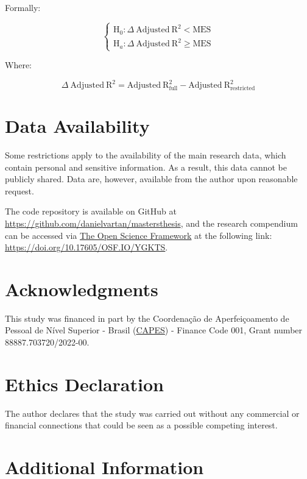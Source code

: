 \documentclass[
12pt,
openright,
oneside,
a4paper,
chapter=TITLE,
section=TITLE,
french,
spanish,
brazil,
english
]{abntex2}
\begin{document}
Formally:

\[
\begin{cases}
\text{H}_{0}: \Delta \ \text{Adjusted} \ \text{R}^{2} < \text{MES} \\
\text{H}_{a}: \Delta \ \text{Adjusted} \ \text{R}^{2} \geq \text{MES}
\end{cases}
\]

\medskip

Where:

\[
\Delta \ \text{Adjusted} \ \text{R}^{2} = \text{Adjusted} \ \text{R}^{2}_{\text{full}} - \text{Adjusted} \ \text{R}^{2}_{\text{restricted}}
\]

\medskip

\section{Data Availability}\label{data-availability}

Some restrictions apply to the availability of the main research data,
which contain personal and sensitive information. As a result, this data
cannot be publicly shared. Data are, however, available from the author
upon reasonable request.

The code repository is available on GitHub at
\url{https://github.com/danielvartan/mastersthesis}, and the research
compendium can be accessed via \href{https://osf.io/}{The Open Science
Framework} at the following link:
\url{https://doi.org/10.17605/OSF.IO/YGKTS}.

\section{Acknowledgments}\label{acknowledgments}

This study was financed in part by the Coordenação de Aperfeiçoamento de
Pessoal de Nível Superior - Brasil
(\href{https://www.gov.br/capes/}{CAPES}) - Finance Code 001, Grant
number 88887.703720/2022-00.

\section{Ethics Declaration}\label{ethics-declaration}

The author declares that the study was carried out without any
commercial or financial connections that could be seen as a possible
competing interest.

\section{Additional Information}\label{additional-information}
\end{document}
